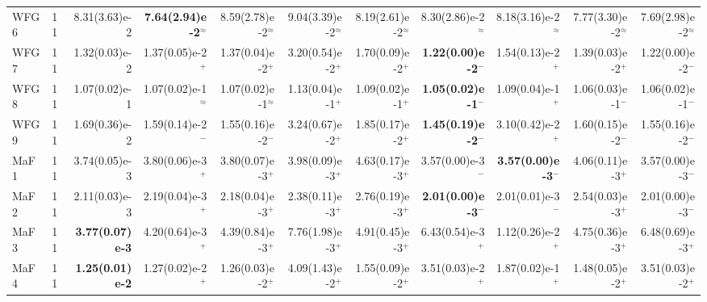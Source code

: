 \documentclass[pdflatex,sn-mathphys-ay]{sn-jnl}%
\theoremstyle{thmstyleone}%
\theoremstyle{thmstyletwo}%
\theoremstyle{thmstylethree}%
\begin{document}
\begin{landscape}
{\begin{longtable}{llrrrrrrrrr}
			WFG6                              & 11  & 8.31(3.63)e-2          & \textbf{7.64(2.94)e-2}$^{\approx}$ & 8.59(2.78)e-2$^{\approx}$    & 9.04(3.39)e-2$^{\approx}$ & 8.19(2.61)e-2$^{\approx}$ & 8.30(2.86)e-2$^{\approx}$    & 8.18(3.16)e-2$^{\approx}$    & 7.77(3.30)e-2$^{\approx}$    & 7.69(2.98)e-2$^{\approx}$   \\
			WFG7                              & 11  & 1.32(0.03)e-2          & 1.37(0.05)e-2$^{+}$                & 1.37(0.04)e-2$^{+}$          & 3.20(0.54)e-2$^{+}$       & 1.70(0.09)e-2$^{+}$       & \textbf{1.22(0.00)e-2}$^{-}$ & 1.54(0.13)e-2$^{+}$          & 1.39(0.03)e-2$^{+}$          & 1.22(0.00)e-2$^{-}$         \\
			WFG8                              & 11  & 1.07(0.02)e-1          & 1.07(0.02)e-1$^{\approx}$          & 1.07(0.02)e-1$^{\approx}$    & 1.13(0.04)e-1$^{+}$       & 1.09(0.02)e-1$^{+}$       & \textbf{1.05(0.02)e-1}$^{-}$ & 1.09(0.04)e-1$^{+}$          & 1.06(0.03)e-1$^{-}$          & 1.06(0.02)e-1$^{-}$         \\
			WFG9                              & 11  & 1.69(0.36)e-2          & 1.59(0.14)e-2$^{-}$                & 1.55(0.16)e-2$^{-}$          & 3.24(0.67)e-2$^{+}$       & 1.85(0.17)e-2$^{+}$       & \textbf{1.45(0.19)e-2}$^{-}$ & 3.10(0.42)e-2$^{+}$          & 1.60(0.15)e-2$^{-}$          & 1.55(0.16)e-2$^{-}$         \\
			\midrule
			MaF1                              & 11  & 3.74(0.05)e-3          & 3.80(0.06)e-3$^{+}$                & 3.80(0.07)e-3$^{+}$          & 3.98(0.09)e-3$^{+}$       & 4.63(0.17)e-3$^{+}$       & 3.57(0.00)e-3$^{-}$          & \textbf{3.57(0.00)e-3}$^{-}$ & 4.06(0.11)e-3$^{+}$          & 3.57(0.00)e-3$^{-}$         \\
			MaF2                              & 11  & 2.11(0.03)e-3          & 2.19(0.04)e-3$^{+}$                & 2.18(0.04)e-3$^{+}$          & 2.38(0.11)e-3$^{+}$       & 2.76(0.19)e-3$^{+}$       & \textbf{2.01(0.00)e-3}$^{-}$ & 2.01(0.01)e-3$^{-}$          & 2.54(0.03)e-3$^{+}$          & 2.01(0.00)e-3$^{-}$         \\
			MaF3                              & 11  & \textbf{3.77(0.07)e-3} & 4.20(0.64)e-3$^{+}$                & 4.39(0.84)e-3$^{+}$          & 7.76(1.98)e-3$^{+}$       & 4.91(0.45)e-3$^{+}$       & 6.43(0.54)e-3$^{+}$          & 1.12(0.26)e-2$^{+}$          & 4.75(0.36)e-3$^{+}$          & 6.48(0.69)e-3$^{+}$         \\
			MaF4                              & 11  & \textbf{1.25(0.01)e-2} & 1.27(0.02)e-2$^{+}$                & 1.26(0.03)e-2$^{+}$          & 4.09(1.43)e-2$^{+}$       & 1.55(0.09)e-2$^{+}$       & 3.51(0.03)e-2$^{+}$          & 1.87(0.02)e-1$^{+}$          & 1.48(0.05)e-2$^{+}$          & 3.51(0.03)e-2$^{+}$         \\

\end{longtable}}
\end{landscape}
\end{document}
